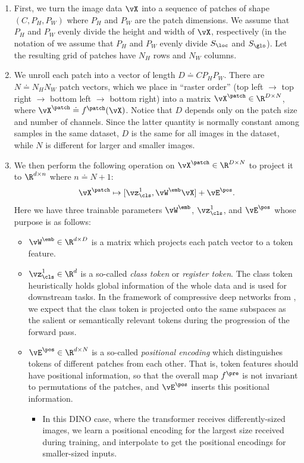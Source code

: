 \documentclass[../../book-main.tex]{subfiles}
\begin{document}
\begin{enumerate}
    \item First, we turn the image data \(\vX\) into a sequence of patches of shape \((C, P_{H}, P_{W})\) where \(P_{H}\) and \(P_{W}\) are the patch dimensions. We assume that \(P_{H}\) and \(P_{W}\) evenly divide the height and width of \(\vX\), respectively (in the notation of  we assume that \(P_{H}\) and \(P_{W}\) evenly divide \(S_{\loc}\) and \(S_{\glo}\)). Let the resulting grid of patches have \(N_{H}\) rows and \(N_{W}\) columns.
    \item We unroll each patch into a vector of length \(D \doteq CP_{H}P_{W}\). There are \(N \doteq N_{H}N_{W}\) patch vectors, which we place in ``raster order'' (top left \(\to\) top right \(\to\) bottom left \(\to\) bottom right) into a matrix \(\vX^{\patch} \in \R^{D \times N}\), where \(\vX^{\patch} \doteq f^{\patch}(\vX)\). Notice that \(D\) depends only on the patch size and number of channels. Since the latter quantity is normally constant among samples in the same dataset, \(D\) is the same for all images in the dataset, while \(N\) is different for larger and smaller images.
    \item We then perform the following operation on \(\vX^{\patch} \in \R^{D \times N}\) to project it to \(\R^{d \times n}\) where \(n \doteq N + 1\):
    \begin{equation}
        \vX^{\patch} \mapsto [\vz_{\cls}^{1}, \vW^{\emb}\vX] + \vE^{\pos}.
    \end{equation}
    Here we have three trainable parameters \(\vW^{\emb}\), \(\vz_{\cls}^{1}\), and \(\vE^{\pos}\) whose purpose is as follows:
    \begin{itemize}
        \item \(\vW^{\emb} \in \R^{d \times D}\) is a matrix which projects each patch vector to a token feature.
        \item \(\vz_{\cls}^{1} \in \R^{d}\) is a so-called \textit{class token} or \textit{register token}. The class token heuristically holds global information of the whole data and is used for downstream tasks. In the framework of compressive deep networks from , we expect that the class token is projected onto the same subspaces as the salient or semantically relevant tokens during the progression of the forward pass.
        \item \(\vE^{\pos} \in \R^{d \times N}\) is a so-called \textit{positional encoding} which distinguishes tokens of different patches from each other. That is, token features should have positional information, so that the overall map \(f^{\pre}\) is not invariant to permutations of the patches, and \(\vE^{\pos}\) inserts this positional information. 
        \begin{itemize}
            \item In this DINO case, where the transformer receives differently-sized images, we learn a positional encoding for the largest size received during training, and interpolate to get the positional encodings for smaller-sized inputs.
        \end{itemize}
    \end{itemize}
\end{enumerate}
\end{document}
